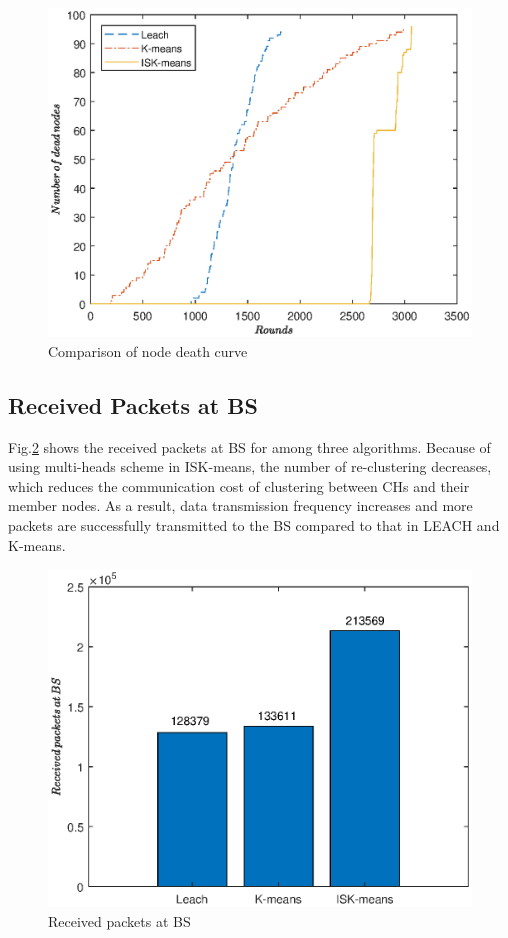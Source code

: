 \documentclass[journal,twoside,web]{ieeecolor}
\begin{document}
\begin{figure}[!t]
	\centering
	\includegraphics[width=0.9\linewidth]{nodedead.eps}
	\caption{Comparison of node death curve}
	\label{fig10}
\end{figure}

\subsection{Received Packets at BS}
Fig.\ref{fig11} shows the received packets at BS for among three algorithms. Because of using multi-heads scheme in ISK-means, the number of re-clustering decreases, which reduces the communication cost of clustering between CHs and their member nodes. As a result, data transmission frequency increases and more packets are successfully transmitted to the BS compared to that in LEACH and K-means.

\begin{figure}[h!]
	\centering
	\includegraphics[width=0.9\linewidth]{packet1.eps}
	\caption{Received packets at BS}
	\label{fig11}
\end{figure}
\end{document}
